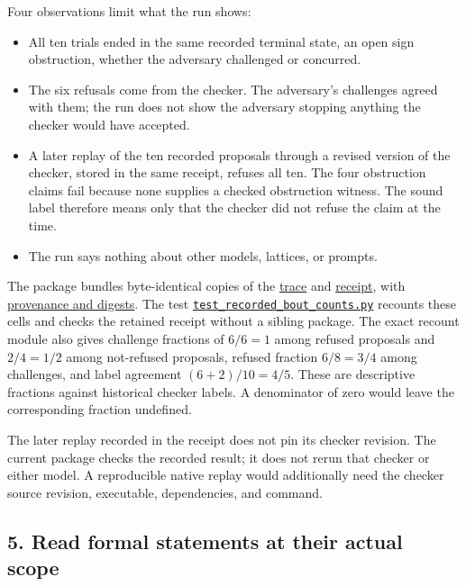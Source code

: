 \documentclass[
  11pt,
]{article}
\providecommand{\tightlist}{%
  \setlength{\itemsep}{0pt}\setlength{\parskip}{0pt}}
\begin{document}
Four observations limit what the run shows:

\begin{itemize}
\tightlist
\item
  All ten trials ended in the same recorded terminal state, an open sign
  obstruction, whether the adversary challenged or concurred.
\item
  The six refusals come from the checker. The adversary's challenges
  agreed with them; the run does not show the adversary stopping
  anything the checker would have accepted.
\item
  A later replay of the ten recorded proposals through a revised version
  of the checker, stored in the same receipt, refuses all ten. The four
  obstruction claims fail because none supplies a checked obstruction
  witness. The sound label therefore means only that the checker did not
  refuse the claim at the time.
\item
  The run says nothing about other models, lattices, or prompts.
\end{itemize}

The package bundles byte-identical copies of the
\href{docs/historical_evidence/demo2_r7_adversarial_debate_1790210039.jsonl}{trace}
and
\href{docs/historical_evidence/demo2_r7_adversarial_debate_receipt.json}{receipt},
with \href{docs/historical_evidence/provenance.json}{provenance and
digests}. The test
\href{code/tests/test_recorded_bout_counts.py}{\nolinkurl{test_recorded_bout_counts.py}}
recounts these cells and checks the retained receipt without a sibling
package. The exact recount module also gives challenge fractions of
\(6/6=1\) among refused proposals and \(2/4=1/2\) among not-refused
proposals, refused fraction \(6/8=3/4\) among challenges, and label
agreement \((6+2)/10=4/5\). These are descriptive fractions against
historical checker labels. A denominator of zero would leave the
corresponding fraction undefined.

The later replay recorded in the receipt does not pin its checker
revision. The current package checks the recorded result; it does not
rerun that checker or either model. A reproducible native replay would
additionally need the checker source revision, executable, dependencies,
and command.

\subsection{5. Read formal statements at their actual
scope}\label{read-formal-statements-at-their-actual-scope}
\end{document}
